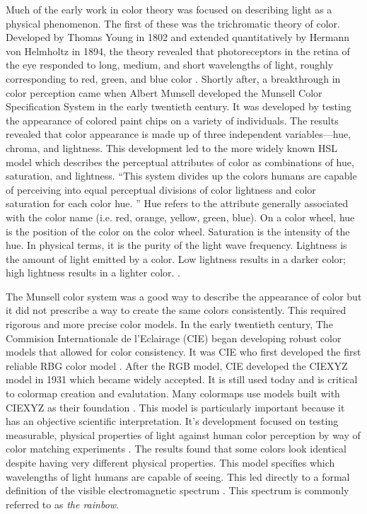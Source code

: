 \documentclass[journal,12pt]{IEEEtran}
\begin{document}
Much of the early work in color theory was focused on describing light as a physical phenomenon.
The first of these was the trichromatic theory of color. 
Developed by Thomas Young in 1802 and extended quantitatively by 
Hermann von Helmholtz in 1894, the theory revealed that photoreceptors
in the retina of the eye responded to long, medium, and short wavelengths of light, 
roughly corresponding to red, green, and blue color \cite{colorimetry}.
Shortly after, a breakthrough in color perception came when
Albert Munsell developed the Munsell Color Specification System in the early twentieth century.
It was developed by testing the appearance of colored paint chips on a variety of individuals.
The results revealed that color appearance is made up of
three independent variables---hue, chroma, and lightness.
This development led to the more
widely known HSL model which describes the perceptual attributes of color as combinations of hue,
saturation, and lightness\cite{colormapping,colorimetry}.
``This system
divides up the colors humans are capable of perceiving
into equal perceptual divisions of color lightness and
color saturation for each color hue. \cite{colormapping}''
Hue refers to the attribute generally associated with the color name (i.e. red,
orange, yellow, green, blue). On a color wheel, hue is the position of the color
on the color wheel. Saturation is the intensity of the hue. In
physical terms, it is the purity of the light wave frequency. Lightness is the
amount of light emitted by a color. Low lightness results in a darker color;
high lightness results in a lighter color. \cite{colorguidelines}.

The Munsell color system was a good way to describe the appearance of color but it did
not prescribe a way to create the same colors consistently.
This required rigorous and more precise color models. In the early twentieth century,
The Commision Internationale de l'Eclairage (CIE) began developing robust color models
that allowed for color consistency. It was CIE who first developed the first reliable
RBG color model \cite{colorimetry}.
After the RGB model, CIE developed the CIEXYZ model in 1931
which became widely accepted. It is still used today and is critical to colormap creation
and evalutation. Many colormaps use models built with CIEXYZ as their foundation \cite{viridis}.
This model is particularly important because it has an objective scientific interpretation.
It's development focused on testing measurable, physical properties of light
against human color perception by way of color matching experiments 
\cite{colorimetry}. The results found that some colors look identical despite having very different physical
properties. This model specifies which wavelengths of light humans 
are capable of seeing. This led directly to a formal definition of the visible electromagnetic
spectrum \cite{colormapping}. This spectrum is commonly referred to as \textit{the rainbow}.
\end{document}
